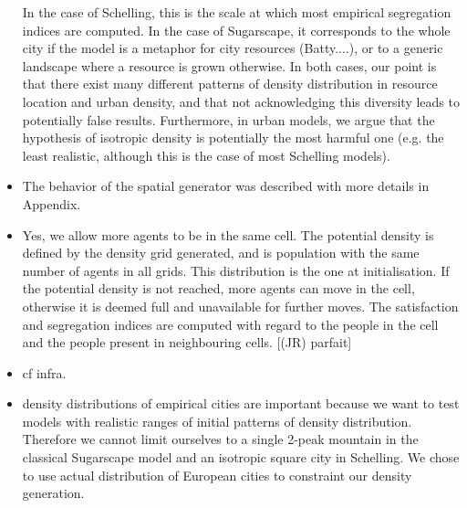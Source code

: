 \documentclass[11pt,a4paper,sans]{moderncv}        %
\begin{document}
\begin{itemize}
	In the case of Schelling, this is the scale at which most empirical segregation indices are computed. In the case of Sugarscape, it corresponds to the whole city if the model is a metaphor for city resources (Batty....), or to a generic landscape where a resource is grown otherwise. In both cases, our point is that there exist many different patterns of density distribution in resource location and urban density, and that not acknowledging this diversity leads to potentially false results. Furthermore, in urban models, we argue that the hypothesis of isotropic density is potentially the most harmful one (e.g. the least realistic, although this is the case of most Schelling models).
	
	
	\item The behavior of the spatial generator was described with more details in Appendix.
	
	\item Yes, we allow more agents to be in the same cell. The potential density is defined by the density grid generated, and is population with the same number of agents in all grids. This distribution is the one at initialisation. If the potential density is not reached, more agents can move in the cell, otherwise it is deemed full and unavailable for further moves. The satisfaction and segregation indices are computed with regard to the people in the cell and the people present in neighbouring cells.
	[(JR) parfait]
	
	\item cf infra. 
	\item density distributions of empirical cities are important because we want to test models with realistic ranges of initial patterns of density distribution. Therefore we cannot limit ourselves to a single 2-peak mountain in the classical Sugarscape model and an isotropic square city in Schelling. We chose to use actual distribution of European cities to constraint our density generation.
	

\end{itemize}
\end{document}
